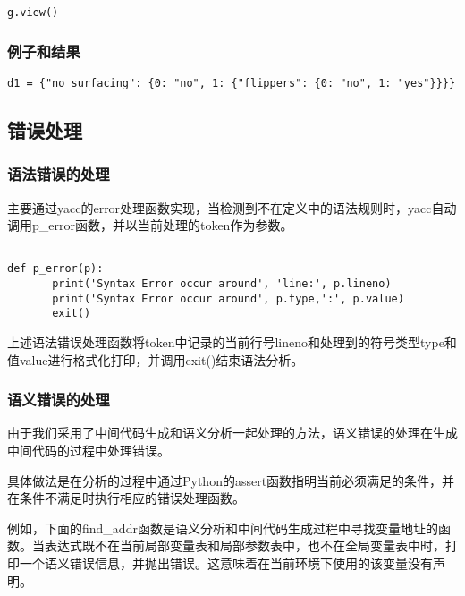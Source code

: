 \documentclass{article}
\begin{document}
\begin{verbatim}
g.view()
\end{verbatim}

\subsubsection{例子和结果}

\begin{verbatim}
d1 = {"no surfacing": {0: "no", 1: {"flippers": {0: "no", 1: "yes"}}}}
\end{verbatim}


\subsection{错误处理}

\subsubsection{语法错误的处理}


主要通过yacc的error处理函数实现，当检测到不在定义中的语法规则时，yacc自动调用p\_error函数，并以当前处理的token作为参数。

\begin{verbatim}

def p_error(p):
       print('Syntax Error occur around', 'line:', p.lineno)
       print('Syntax Error occur around', p.type,':', p.value)
       exit()

\end{verbatim}

上述语法错误处理函数将token中记录的当前行号lineno和处理到的符号类型type和值value进行格式化打印，并调用exit()结束语法分析。

\subsubsection{语义错误的处理}

由于我们采用了中间代码生成和语义分析一起处理的方法，语义错误的处理在生成中间代码的过程中处理错误。

具体做法是在分析的过程中通过Python的assert函数指明当前必须满足的条件，并在条件不满足时执行相应的错误处理函数。

例如，下面的find\_addr函数是语义分析和中间代码生成过程中寻找变量地址的函数。当表达式既不在当前局部变量表和局部参数表中，也不在全局变量表中时，打印一个语义错误信息，并抛出错误。这意味着在当前环境下使用的该变量没有声明。
\end{document}
